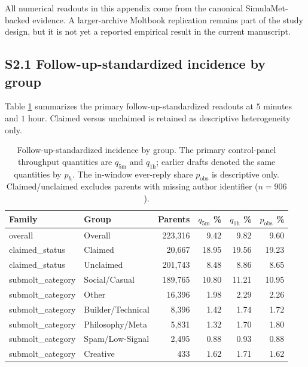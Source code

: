 All numerical readouts in this appendix come from the canonical
SimulaMet-backed evidence. A larger-archive Moltbook replication remains part
of the study design, but it is not yet a reported empirical result in the
current manuscript.

\subsection*{S2.1 Follow-up-standardized incidence by group}

Table \ref{tab:supp-horizon-incidence-groups} summarizes the primary
follow-up-standardized readouts at \(5\) minutes and \(1\) hour. Claimed versus
unclaimed is retained as descriptive heterogeneity only.

\begin{table}[h]
\centering
\caption{Follow-up-standardized incidence by group. The primary control-panel
throughput quantities are \(q_{5\mathrm{m}}\) and \(q_{1\mathrm{h}}\); earlier
drafts denoted the same quantities by \(p_h\). The in-window ever-reply share
\(p_{\mathrm{obs}}\) is descriptive only. Claimed/unclaimed excludes parents
with missing author identifier (\(n=906\)).}
\label{tab:supp-horizon-incidence-groups}
\small
\begin{tabular}{@{}llrrrr@{}}
\toprule
\textbf{Family} & \textbf{Group} & \textbf{Parents} & \textbf{\(q_{5\mathrm{m}}\) \%} & \textbf{\(q_{1\mathrm{h}}\) \%} & \textbf{\(p_{\mathrm{obs}}\) \%} \\
\midrule
overall & Overall & 223,316 & 9.42 & 9.82 & 9.60 \\
claimed\_status & Claimed & 20,667 & 18.95 & 19.56 & 19.23 \\
claimed\_status & Unclaimed & 201,743 & 8.48 & 8.86 & 8.65 \\
submolt\_category & Social/Casual & 189,765 & 10.80 & 11.21 & 10.95 \\
submolt\_category & Other & 16,396 & 1.98 & 2.29 & 2.26 \\
submolt\_category & Builder/Technical & 8,396 & 1.42 & 1.74 & 1.72 \\
submolt\_category & Philosophy/Meta & 5,831 & 1.32 & 1.70 & 1.80 \\
submolt\_category & Spam/Low-Signal & 2,495 & 0.88 & 0.93 & 0.88 \\
submolt\_category & Creative & 433 & 1.62 & 1.71 & 1.62 \\
\bottomrule
\end{tabular}
\end{table}

